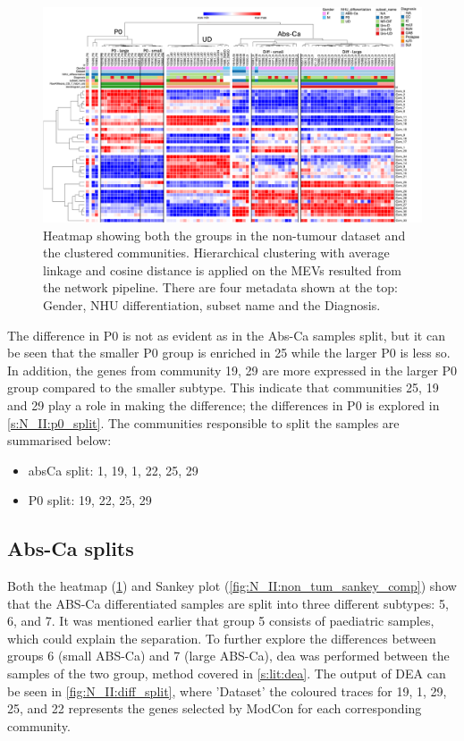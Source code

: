 \begin{figure}
    \includegraphics[width=1.0\textwidth,height=1.0\textheight,keepaspectratio]{Sections/Network_II/resources/non_tum/norm_healthy_std_3.1.png}
    \caption[Heatmap of the new non-tumour subgroups]{Heatmap showing both the groups in the non-tumour dataset and the clustered communities. Hierarchical clustering with average linkage and cosine distance is applied on the MEVs resulted from the network pipeline. There are four metadata shown at the top: Gender, NHU differentiation, subset name and the Diagnosis. }
    \label{fig:N_II:morph_non_tum}
\end{figure}


The difference in P0 is not as evident as in the Abs-Ca samples split, but it can be seen that the smaller P0 group is enriched in 25 while the larger P0 is less so. In addition, the genes from community 19, 29 are more expressed in the larger P0 group compared to the smaller subtype. This indicate that communities 25, 19 and 29 play a role in making the difference; the differences in P0 is explored in \cref{s:N_II:p0_split}. The communities responsible to split the samples are summarised below:
\begin{itemize}
    \item \acrshort{absCa} split: 1, 19, 1, 22, 25, 29
    \item P0 split: 19, 22, 25, 29
\end{itemize}

\subsection{Abs-Ca splits} \label{s:N_II:diff_split}

Both the heatmap (\cref{fig:N_II:morph_non_tum}) and Sankey plot (\cref{fig:N_II:non_tum_sankey_comp}) show that the ABS-Ca differentiated samples are split into three different subtypes: 5, 6, and 7. It was mentioned earlier that group 5 consists of paediatric samples, which could explain the separation. To further explore the differences between groups 6 (small ABS-Ca) and 7 (large ABS-Ca), \acrlong{dea} was performed between the samples of the two group, method covered in \cref{s:lit:dea}. The output of DEA can be seen in \cref{fig:N_II:diff_split}, where 'Dataset' the coloured traces for 19, 1, 29, 25, and 22 represents the genes selected by ModCon for each corresponding community.

